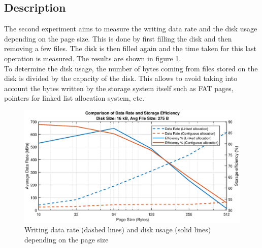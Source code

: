 \documentclass[10pt,a4paper]{ULBreport}
\begin{document}
\subsection{Description}
The second experiment aims to measure the writing data rate and the disk usage depending on the page size. This is done by first filling the disk and then removing a few files. The disk is then filled again and the time taken for this last operation is measured. The results are shown in figure \ref{fig:normalOP}. \\
To determine the disk usage, the number of bytes coming from files stored on the disk is divided by the capacity of the disk. This allows to avoid taking into account the bytes written by the storage system itself such as FAT pages, pointers for linked list allocation system, etc. \\
\begin{figure}
    \centering
    \includegraphics[width=1\textwidth]{normalConditions.eps}
    \caption{Writing data rate (dashed lines) and disk usage (solid lines) depending on the page size}
    \label{fig:normalOP}
\end{figure}
\end{document}
